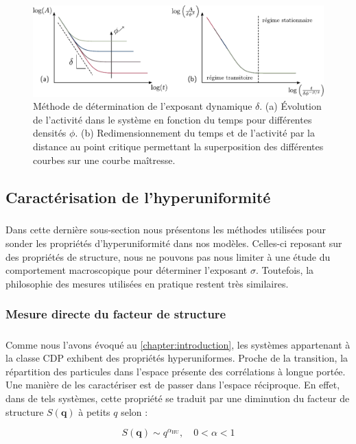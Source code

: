 \begin{figure}[h]
	\centering
	\includegraphics[width=\textwidth]{Chapitre2/Figures/Methodes/Delta.pdf}
	\caption{Méthode de détermination de l'exposant dynamique $\delta$. (a) Évolution de l'activité dans le système en fonction du temps pour différentes densités $\phi$. (b) Redimensionnement du temps et de l'activité par la distance au point critique permettant la superposition des différentes courbes sur une courbe maîtresse.}
	\label{fig:DeltaDeter}
\end{figure}

\subsection{Caractérisation de l'hyperuniformité}

\label{sec:MethodHU}

\subparagraph{}Dans cette dernière sous-section nous présentons les méthodes utilisées pour sonder les propriétés d'hyperuniformité dans nos modèles. Celles-ci reposant sur des propriétés de structure, nous ne pouvons pas nous limiter à une étude du comportement macroscopique pour déterminer l'exposant $\sigma$. Toutefois, la philosophie des mesures utilisées en pratique restent très similaires.

\subsubsection{Mesure directe du facteur de structure}

\subparagraph{}Comme nous l'avons évoqué au \autoref{chapter:introduction}, les systèmes appartenant à la classe CDP exhibent des propriétés hyperuniformes. Proche de la transition, la répartition des particules dans l'espace présente des corrélations à longue portée. Une manière de les caractériser  est de passer dans l'espace réciproque. En effet, dans de tels systèmes, cette propriété se traduit par une diminution du facteur de structure $S(\mathbf{q})$ à petits $q$ selon :

\begin{equation}
	S(\mathbf{q})\sim q^{\alpha_\text{HU}}, \quad 0 < \alpha < 1
\end{equation}

